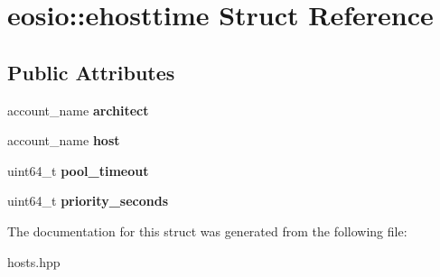 \hypertarget{structeosio_1_1ehosttime}{}\section{eosio\+:\+:ehosttime Struct Reference}
\label{structeosio_1_1ehosttime}
\subsection*{Public Attributes}
\begin{DoxyCompactItemize}
\item 
\mbox{\label{structeosio_1_1ehosttime_a732a4020edc4663cbdecf109fb9b5013}} 
account\+\_\+name {\bfseries architect}
\item 
\mbox{\label{structeosio_1_1ehosttime_a649b06c6d63f9bfa4abed07c2e2e3918}} 
account\+\_\+name {\bfseries host}
\item 
\mbox{\label{structeosio_1_1ehosttime_adccb11fd610995c75e9db50d5b47936e}} 
uint64\+\_\+t {\bfseries pool\+\_\+timeout}
\item 
\mbox{\label{structeosio_1_1ehosttime_ad1803b5005f3790e8d880a9cc3bb9bf0}} 
uint64\+\_\+t {\bfseries priority\+\_\+seconds}
\end{DoxyCompactItemize}


The documentation for this struct was generated from the following file\+:\begin{DoxyCompactItemize}
\item 
hosts.\+hpp\end{DoxyCompactItemize}

